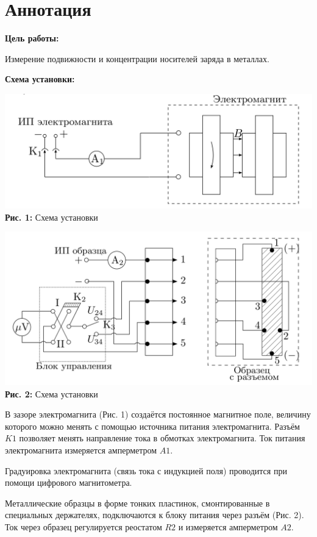 \documentclass[12pt,a4paper]{scrartcl}
\begin{document}
	\section{Аннотация}
	
	\textbf{Цель работы: }
	
	Измерение подвижности и концентрации носителей заряда в металлах.
	
	\textbf{Схема установки:}
	\begin{center}
		\includegraphics[scale=0.25]{PIC_1.png}
		\\\textbf{Рис. 1:} Схема установки
	\end{center}	

	\begin{center}
		\includegraphics[scale=0.25]{PIC_2.png}
		\\\textbf{Рис. 2:} Схема установки
	\end{center}
		
	В зазоре электромагнита (Рис. 1) создаётся постоянное магнитное поле, величину которого можно менять с помощью источника питания электромагнита. Разъём $K1$ позволяет менять направление тока в обмотках электромагнита. Ток питания электромагнита измеряется амперметром $A1$.
	
	Градуировка электромагнита (связь тока с индукцией поля) проводится при помощи цифрового магнитометра.
	
	Металлические образцы в форме тонких пластинок, смонтированные в специальных держателях, подключаются к блоку питания через разъём (Рис. 2). Ток через образец регулируется реостатом $R2$ и измеряется
	амперметром $A2$.
	
\end{document}
